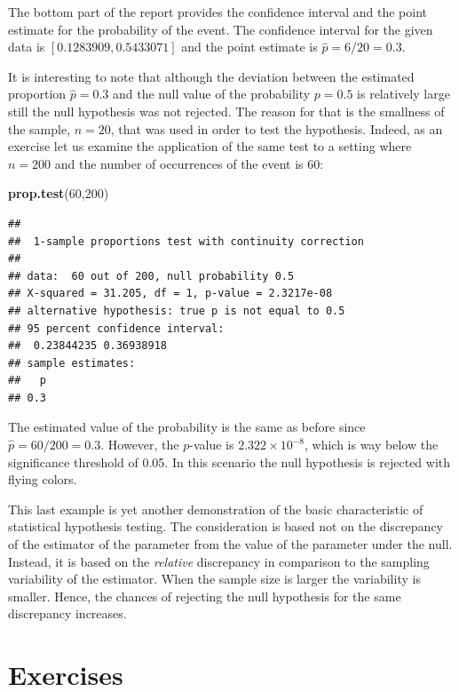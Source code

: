 \documentclass[]{krantz}
\makeatletter
\newenvironment{Shaded}{\begin{snugshade}}{\end{snugshade}}
\newcommand{\DecValTok}[1]{\textcolor[rgb]{0.00,0.00,0.81}{#1}}
\newcommand{\KeywordTok}[1]{\textcolor[rgb]{0.13,0.29,0.53}{\textbf{#1}}}
\newcommand{\NormalTok}[1]{#1}
\newenvironment{kframe}{%
\medskip{}
\setlength{\fboxsep}{.8em}
 \def\at@end@of@kframe{}%
 \ifinner\ifhmode%
  \def\at@end@of@kframe{\end{minipage}}%
  \begin{minipage}{\columnwidth}%
 \fi\fi%
 \def\FrameCommand##1{\hskip\@totalleftmargin \hskip-\fboxsep
 \colorbox{shadecolor}{##1}\hskip-\fboxsep
     \hskip-\linewidth \hskip-\@totalleftmargin \hskip\columnwidth}%
 \MakeFramed {\advance\hsize-\width
   \@totalleftmargin\z@ \linewidth\hsize
   \@setminipage}}%
 {\par\unskip\endMakeFramed%
 \at@end@of@kframe}
\renewenvironment{Shaded}{\begin{kframe}}{\end{kframe}}
\theoremstyle{definition}
\theoremstyle{definition}
\theoremstyle{definition}
\theoremstyle{remark}
\makeatother
\begin{document}
The bottom part of the report provides the confidence interval and the
point estimate for the probability of the event. The confidence interval
for the given data is \([0.1283909, 0.5433071]\) and the point estimate is
\(\hat p = 6/20 = 0.3\).

It is interesting to note that although the deviation between the
estimated proportion \(\hat p = 0.3\) and the null value of the
probability \(p = 0.5\) is relatively large still the null hypothesis was
not rejected. The reason for that is the smallness of the sample,
\(n = 20\), that was used in order to test the hypothesis. Indeed, as an
exercise let us examine the application of the same test to a setting
where \(n = 200\) and the number of occurrences of the event is 60:

\begin{Shaded}
\begin{Highlighting}[]
\KeywordTok{prop.test}\NormalTok{(}\DecValTok{60}\NormalTok{,}\DecValTok{200}\NormalTok{)}
\end{Highlighting}
\end{Shaded}

\begin{verbatim}
## 
##  1-sample proportions test with continuity correction
## 
## data:  60 out of 200, null probability 0.5
## X-squared = 31.205, df = 1, p-value = 2.3217e-08
## alternative hypothesis: true p is not equal to 0.5
## 95 percent confidence interval:
##  0.23844235 0.36938918
## sample estimates:
##   p 
## 0.3
\end{verbatim}

The estimated value of the probability is the same as before since
\(\hat p = 60/200 = 0.3\). However, the \(p\)-value is
\(2.322 \times 10^{-8}\), which is way below the significance threshold of
0.05. In this scenario the null hypothesis is rejected with flying
colors.

This last example is yet another demonstration of the basic
characteristic of statistical hypothesis testing. The consideration is
based not on the discrepancy of the estimator of the parameter from the
value of the parameter under the null. Instead, it is based on the
\emph{relative} discrepancy in comparison to the sampling variability of the
estimator. When the sample size is larger the variability is smaller.
Hence, the chances of rejecting the null hypothesis for the same
discrepancy increases.

\hypertarget{exercises-7}{%
\section{Exercises}\label{exercises-7}}
\end{document}

